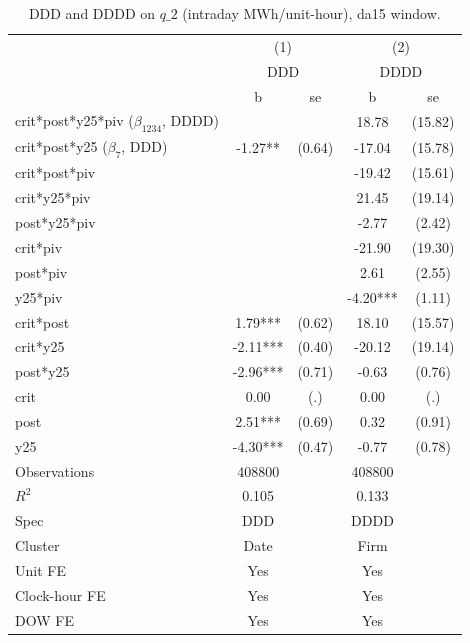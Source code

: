 \begin{table}[htbp]\centering
\def\sym#1{\ifmmode^{#1}\else\(^{#1}\)\fi}
\caption{DDD and DDDD on $q\_2$ (intraday MWh/unit-hour), da15 window.}\label{tab:reform_ddd_firm_q2_da15}
\begin{tabular}{l*{2}{cc}}
\toprule
                    &\multicolumn{2}{c}{(1)}     &\multicolumn{2}{c}{(2)}     \\
                    &\multicolumn{2}{c}{DDD}     &\multicolumn{2}{c}{DDDD}    \\
                    &           b   &          se&           b   &          se\\
\midrule
crit*post*y25*piv ($\beta_{1234}$, DDDD)&               &            &       18.78   &     (15.82)\\
crit*post*y25 ($\beta_7$, DDD)&       -1.27** &      (0.64)&      -17.04   &     (15.78)\\
crit*post*piv       &               &            &      -19.42   &     (15.61)\\
crit*y25*piv        &               &            &       21.45   &     (19.14)\\
post*y25*piv        &               &            &       -2.77   &      (2.42)\\
crit*piv            &               &            &      -21.90   &     (19.30)\\
post*piv            &               &            &        2.61   &      (2.55)\\
y25*piv             &               &            &       -4.20***&      (1.11)\\
crit*post           &        1.79***&      (0.62)&       18.10   &     (15.57)\\
crit*y25            &       -2.11***&      (0.40)&      -20.12   &     (19.14)\\
post*y25            &       -2.96***&      (0.71)&       -0.63   &      (0.76)\\
crit                &        0.00   &         (.)&        0.00   &         (.)\\
post                &        2.51***&      (0.69)&        0.32   &      (0.91)\\
y25                 &       -4.30***&      (0.47)&       -0.77   &      (0.78)\\
\midrule
Observations        &      408800   &            &      408800   &            \\
$R^2$               &       0.105   &            &       0.133   &            \\
Spec                &         DDD   &            &        DDDD   &            \\
Cluster             &        Date   &            &        Firm   &            \\
Unit FE             &         Yes   &            &         Yes   &            \\
Clock-hour FE       &         Yes   &            &         Yes   &            \\
DOW FE              &         Yes   &            &         Yes   &            \\
\bottomrule
\end{tabular}
\end{table}
